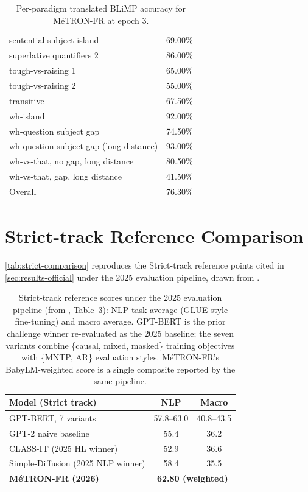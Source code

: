\documentclass[11pt]{article}
\begin{document}
\begin{table}[h]
\begin{tabular}{@{}>{\raggedright\arraybackslash}p{9cm}c@{}}
sentential subject island & 69.00\% \\
superlative quantifiers 2 & 86.00\% \\
tough-vs-raising 1 & 65.00\% \\
tough-vs-raising 2 & 55.00\% \\
transitive & 67.50\% \\
wh-island & 92.00\% \\
wh-question subject gap & 74.50\% \\
wh-question subject gap (long distance) & 93.00\% \\
wh-vs-that, no gap, long distance & 80.50\% \\
wh-vs-that, gap, long distance & 41.50\% \\
\midrule
Overall & 76.30\% \\
\bottomrule
\end{tabular}
\caption{Per-paradigm translated BLiMP accuracy for MéTRON-FR at epoch 3.}
\label{tab:blimp-paradigms}
\end{table}

\section{Strict-track Reference Comparison}
\label{app:strict-comparison}

\autoref{tab:strict-comparison} reproduces the Strict-track reference points cited in \autoref{sec:results-official} under the 2025 evaluation pipeline, drawn from \citet[Table~3]{charpentier2025babylm}.

\begin{table}[h]
\centering
\small
\begin{tabular}{lcc}
\toprule
Model (Strict track) & NLP & Macro \\
\midrule
GPT-BERT, 7 variants & 57.8--63.0 & 40.8--43.5 \\
GPT-2 naive baseline & 55.4 & 36.2 \\
CLASS-IT (2025 HL winner) & 52.9 & 36.6 \\
Simple-Diffusion (2025 NLP winner) & 58.4 & 35.5 \\
\midrule
\textbf{MéTRON-FR (2026)} & \multicolumn{2}{c}{\textbf{62.80 (weighted)}} \\
\bottomrule
\end{tabular}
\caption{Strict-track reference scores under the 2025 evaluation pipeline (from \citealp{charpentier2025babylm}, Table~3): NLP-task average (GLUE-style fine-tuning) and macro average. GPT-BERT \citep{charpentier2024gptbert} is the prior challenge winner re-evaluated as the 2025 baseline; the seven variants combine \{causal, mixed, masked\} training objectives with \{MNTP, AR\} evaluation styles. MéTRON-FR's BabyLM-weighted score is a single composite reported by the same pipeline.}
\label{tab:strict-comparison}
\end{table}
\end{document}
